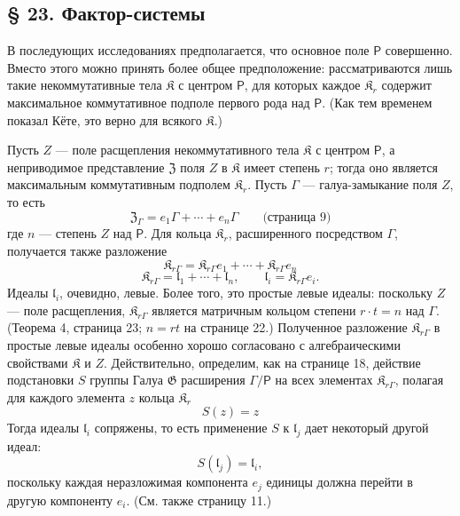 \documentclass[11pt]{article}
\begin{document}
\subsection*{§ 23. Фактор-системы}\label{faktorensysteme}

В последующих исследованиях предполагается, что основное поле \(\mathsf P\) совершенно. Вместо этого можно принять более общее предположение: рассматриваются лишь такие некоммутативные тела \(\mathfrak K\) с центром \(\mathsf P\), для которых каждое \(\mathfrak K_r\) содержит максимальное коммутативное подполе первого рода над \(\mathsf P\). (Как тем временем показал Кёте, это верно для всякого \(\mathfrak K\).)

Пусть \(Z\) --- поле расщепления некоммутативного тела \(\mathfrak K\) с центром \(\mathsf P\), а неприводимое представление \(\mathfrak Z\) поля \(Z\) в \(\mathfrak K\) имеет степень \(r\); тогда оно является максимальным коммутативным подполем \(\mathfrak K_r\). Пусть \(\Gamma\) --- галуа-замыкание поля \(Z\), то есть
\[
\mathfrak Z_\Gamma=e_1\Gamma+\cdots+e_n\Gamma
\qquad\text{(страница 9)}
\]
где \(n\) --- степень \(Z\) над \(\mathsf P\). Для кольца \(\mathfrak K_r\), расширенного посредством \(\Gamma\), получается также разложение
\[
\mathfrak K_{r\Gamma}=\mathfrak K_{r\Gamma}e_1+\cdots+\mathfrak K_{r\Gamma}e_n
\]
\[
\mathfrak K_{r\Gamma}=\mathfrak l_1+\cdots+\mathfrak l_n,\qquad
\mathfrak l_i=\mathfrak K_{r\Gamma}e_i.
\]
Идеалы \(\mathfrak l_i\), очевидно, левые. Более того, это простые левые идеалы: поскольку \(Z\) --- поле расщепления, \(\mathfrak K_{r\Gamma}\) является матричным кольцом степени \(r\cdot t=n\) над \(\Gamma\). (Теорема 4, страница 23; \(n=rt\) на странице 22.) Полученное разложение \(\mathfrak K_{r\Gamma}\) в простые левые идеалы особенно хорошо согласовано с алгебраическими свойствами \(\mathfrak K\) и \(Z\). Действительно, определим, как на странице 18, действие подстановки \(S\) группы Галуа \(\mathfrak G\) расширения \(\Gamma/\mathsf P\) на всех элементах \(\mathfrak K_{r\Gamma}\), полагая для каждого элемента \(z\) кольца \(\mathfrak K_r\)
\[
S(z)=z
\]
Тогда идеалы \(\mathfrak l_i\) сопряжены, то есть применение \(S\) к \(\mathfrak l_j\) дает некоторый другой идеал:
\[
S(\mathfrak l_j)=\mathfrak l_i,
\]
поскольку каждая неразложимая компонента \(e_j\) единицы должна перейти в другую компоненту \(e_i\). (См. также страницу 11.)
\end{document}
